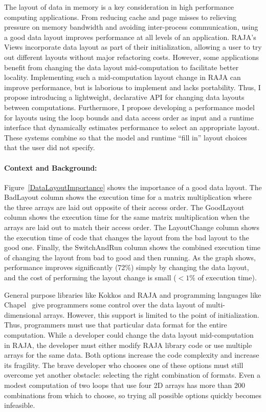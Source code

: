 \documentclass{article}
\begin{document}
The layout of data in memory is a key consideration in high performance computing applications.
From reducing cache and page misses to relieving pressure on memory bandwidth and avoiding inter-process communication, using a good data layout improves performance at all levels of an application.
RAJA's Views incorporate data layout as part of their initialization, allowing a user to try out different layouts without major refactoring costs.
However, some applications benefit from changing the data layout mid-computation to facilitate better locality.
Implementing such a mid-computation layout change in RAJA can improve performance, but is laborious to implement and lacks portability.
Thus, I propose introducing a lightweight, declarative API for changing data layouts between computations.
Furthermore, I propose developing a performance model for layouts using the loop bounds and data access order as input and a runtime interface that dynamically estimates performance to select an appropriate layout. 
These systems combine so that the model and runtime \enquote{fill in} layout choices that the user did not specify.

\paragraph{Context and Background:}

Figure~\ref{DataLayoutImportance} shows the importance of a good data layout. 
The BadLayout column shows the execution time for a matrix multiplication where the three arrays are laid out opposite of their access order. 
The GoodLayout column shows the execution time for the same matrix multiplication when the arrays are laid out to match their access order.
The LayoutChange column shows the execution time of code that changes the layout from the bad layout to the good one.
Finally, the SwitchAndRun column shows the combined execution time of changing the layout from bad to good and then running.
As the graph shows, performance improves  significantly (72\%) simply by changing the data layout, and the cost of performing the layout change is small ($<1\%$ of execution time). 


General purpose libraries like Kokkos and RAJA and programming languages like Chapel~\cite{diaconescu2007approach} give programmers some control over the data layout of multi-dimensional arrays. However, this support is limited to the point of initialization.
Thus, programmers must use that particular data format for the entire computation.
While a developer could change the data layout mid-computation in RAJA, the developer must either modify RAJA library code or use multiple arrays for the same data. 
Both options increase the code complexity and increase its fragility.
The brave developer who chooses one of these options must still overcome yet another obstacle: selecting the right combination of formats.
Even a modest computation of two loops that use four 2D arrays has more than 200 combinations from which to choose, so trying all possible options quickly becomes infeasible. 
\end{document}

